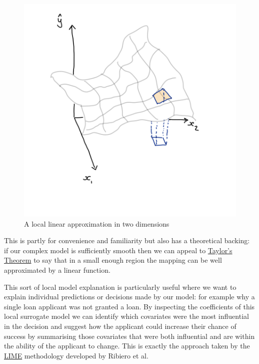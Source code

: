 \documentclass[
  12pt,
]{book}
\begin{document}
\begin{figure}

{\centering \includegraphics[width=12.5in]{images/402-production-explainability/local-linear-approximation} 

}

\caption{A local linear approximation in two dimensions}\label{fig:unnamed-chunk-10}
\end{figure}

This is partly for convenience and familiarity but also has a theoretical backing: if our complex model is sufficiently smooth then we can appeal to \href{https://en.wikipedia.org/wiki/Taylor\%27s_theorem}{Taylor's Theorem} to say that in a small enough region the mapping can be well approximated by a linear function.

This sort of local model explanation is particularly useful where we want to explain individual predictions or decisions made by our model: for example why a single loan applicant was not granted a loan. By inspecting the coefficients of this local surrogate model we can identify which covariates were the most influential in the decision and suggest how the applicant could increase their chance of success by summarising those covariates that were both influential and are within the ability of the applicant to change. This is exactly the approach taken by the \href{https://christophm.github.io/interpretable-ml-book/lime.html}{LIME} methodology developed by Ribiero et al.~
\end{document}
